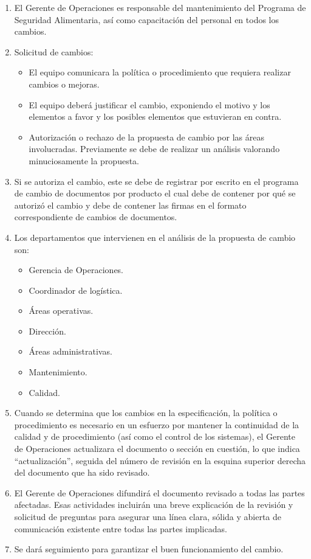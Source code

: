 \begin{enumerate}
	\item El Gerente de Operaciones es responsable del mantenimiento del Programa de Seguridad Alimentaria, así como capacitación del personal en todos los cambios.
	\item Solicitud de cambios:
	\begin{itemize}
		\item El equipo comunicara la política o procedimiento que requiera realizar cambios o mejoras.
		\item El equipo deberá justificar el cambio, exponiendo el motivo y los elementos a favor y los posibles elementos que estuvieran en contra.
		\item Autorización o rechazo de la propuesta de cambio por las áreas involucradas. Previamente se debe de realizar un análisis valorando minuciosamente la propuesta.
	\end{itemize}
	\item Si se autoriza el cambio, este se debe de registrar por escrito en el programa de cambio de documentos por producto el cual debe de contener por qué se autorizó el cambio y debe de contener las firmas en el formato correspondiente de cambios de documentos.
	\item Los departamentos que intervienen en el análisis de la propuesta de cambio son:
	\begin{itemize}
		\item Gerencia de Operaciones.
		\item Coordinador de logística.
		\item Áreas operativas.
		\item Dirección.
		\item Áreas administrativas.
		\item Mantenimiento.
		\item Calidad.
	\end{itemize}
	\item Cuando se determina que los cambios en la especificación, la política o procedimiento es necesario en un esfuerzo por mantener la continuidad de la calidad y de procedimiento (así como el control de los sistemas), el Gerente de Operaciones actualizara el documento o sección en cuestión, lo que indica “actualización”, seguida del número de revisión en la esquina superior derecha del documento que ha sido revisado.
	\item El Gerente de Operaciones difundirá el documento revisado a todas las partes afectadas. Esas actividades incluirán una breve explicación de la revisión y solicitud de preguntas para asegurar una línea clara, sólida y abierta de comunicación existente entre todas las partes implicadas.
	\item Se dará seguimiento para garantizar el buen funcionamiento del cambio.
\end{enumerate}

